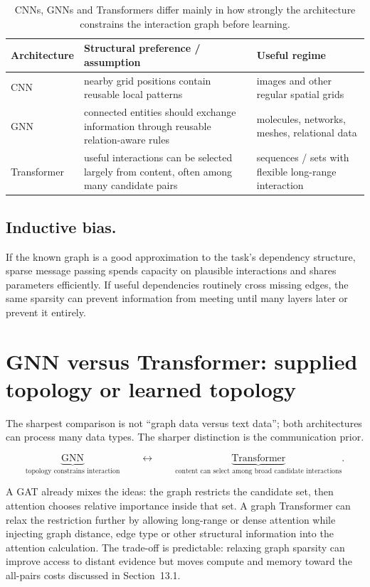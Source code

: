 \begin{table}[htbp]
\centering
\small
\begin{tabular}{p{}p{}p{}}
\toprule
Architecture & Structural preference / assumption & Useful regime \\
\midrule
CNN & nearby grid positions contain reusable local patterns & images and other regular spatial grids \\
GNN & connected entities should exchange information through reusable relation-aware rules & molecules, networks, meshes, relational data \\
Transformer & useful interactions can be selected largely from content, often among many candidate pairs & sequences / sets with flexible long-range interaction \\
\bottomrule
\end{tabular}
\caption{CNNs, GNNs and Transformers differ mainly in how strongly the architecture constrains the interaction graph before learning.}
\label{tab:gnn-inductive-bias}
\end{table}

\subsection{Inductive bias.}
If the known graph is a good approximation to the task's dependency structure, sparse message passing spends capacity on plausible interactions and shares parameters efficiently.
If useful dependencies routinely cross missing edges, the same sparsity can prevent information from meeting until many layers later or prevent it entirely.

\section{GNN versus Transformer: supplied topology or learned topology}
The sharpest comparison is not ``graph data versus text data''; both architectures can process many data types.
The sharper distinction is the communication prior.

\[
\underbrace{\text{GNN}}_{\text{topology constrains interaction}}
\qquad\longleftrightarrow\qquad
\underbrace{\text{Transformer}}_{\text{content can select among broad candidate interactions}}.
\]

A GAT already mixes the ideas: the graph restricts the candidate set, then attention chooses relative importance inside that set.
A graph Transformer can relax the restriction further by allowing long-range or dense attention while injecting graph distance, edge type or other structural information into the attention calculation.
The trade-off is predictable: relaxing graph sparsity can improve access to distant evidence but moves compute and memory toward the all-pairs costs discussed in Section~13.1.

